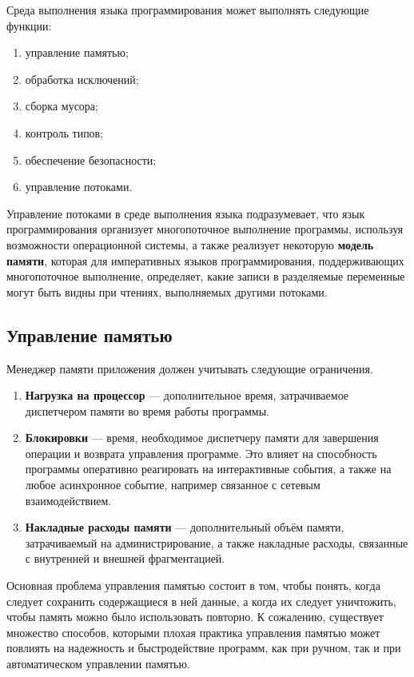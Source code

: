 Среда выполнения языка программирования может выполнять следующие функции:~\cite{dotnet_clr}

\begin{enumerate}[label*=\arabic*)]
	\item управление памятью;
	\item обработка исключений; 
	\item сборка мусора; 
	\item контроль типов;
	\item обеспечение безопасности; 
	\item управление потоками. 
\end{enumerate}

Управление потоками в среде выполнения языка подразумевает, что язык программирования организует многопоточное выполнение программы, используя возможности операционной системы, а также реализует некоторую \textbf{модель памяти}, которая для императивных языков программирования, поддерживающих многопоточное выполнение, определяет, какие записи в разделяемые переменные могут быть видны при чтениях, выполняемых другими потоками.~\cite{memory_model}

\subsection{Управление памятью}
\label{reference_locality}

Менеджер памяти приложения должен учитывать следующие ограничения.~\cite{mm_overview}

\begin{enumerate}[label*=\arabic*.]
	\item \textbf{Нагрузка на процессор} --- дополнительное время, затрачиваемое диспетчером памяти во время работы программы.
	\item \textbf{Блокировки} --- время, необходимое диспетчеру памяти для завершения операции и возврата управления программе. Это влияет на способность программы оперативно реагировать на интерактивные события, а также на любое асинхронное событие, например связанное с сетевым взаимодействием.
	\item \textbf{Накладные расходы памяти} --- дополнительный объём памяти, затрачиваемый на администрирование, а также накладные расходы, связанные с внутренней и внешней фрагментацией.
\end{enumerate}

Основная проблема управления памятью состоит в том, чтобы понять, когда следует сохранить содержащиеся в ней данные, а когда их следует уничтожить, чтобы память можно было использовать повторно. К сожалению, существует множество способов, которыми плохая практика управления памятью может повлиять на надежность и быстродействие программ, как при ручном, так и при автоматическом управлении памятью.

